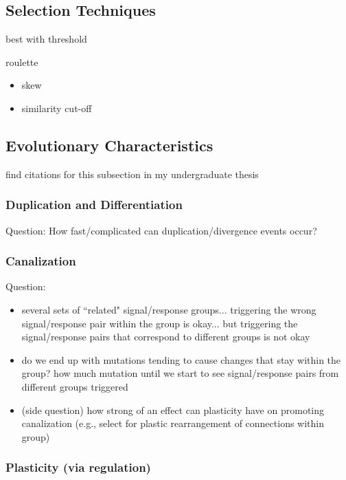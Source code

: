 \subsection{Selection Techniques}

best with threshold \citep{lalejini2019else}

roulette
\begin{itemize}
\item skew
\item similarity cut-off
\end{itemize}

\subsection{Evolutionary Characteristics}

find citations for this subsection in my undergraduate thesis

\subsubsection{Duplication and Differentiation}

Question: How fast/complicated can duplication/divergence events occur?

\subsubsection{Canalization}

Question:
\begin{itemize}
\item several sets of ``related" signal/response groups... triggering the wrong signal/response pair within the group is okay... but triggering the signal/response pairs that correspond to different groups is not okay
\item do we end up with mutations tending to cause changes that stay within the group? how much mutation until we start to see signal/response pairs from different groups triggered
\item (side question) how strong of an effect can plasticity have on promoting canalization (e.g., select for plastic rearrangement of connections within group)
\end{itemize}

\subsubsection{Plasticity (via regulation)}

